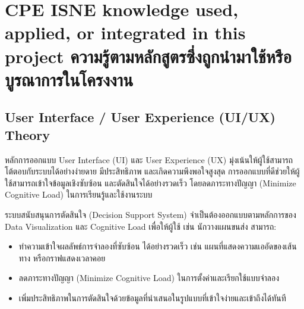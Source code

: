 


\section{\ifenglish%
\ifcpe CPE \else ISNE \fi knowledge used, applied, or integrated in this project
\else%
ความรู้ตามหลักสูตรซึ่งถูกนำมาใช้หรือบูรณาการในโครงงาน
\fi
}
\subsection{User Interface / User Experience (UI/UX) Theory}
หลักการออกแบบ User Interface (UI) และ User Experience (UX) มุ่งเน้นให้ผู้ใช้สามารถโต้ตอบกับระบบได้อย่างง่ายดาย
มีประสิทธิภาพ และเกิดความพึงพอใจสูงสุด การออกแบบที่ดีช่วยให้ผู้ใช้สามารถเข้าใจข้อมูลเชิงซับซ้อน
และตัดสินใจได้อย่างรวดเร็ว โดยลดภาระทางปัญญา (Minimize Cognitive Load) ในการเรียนรู้และใช้งานระบบ

ระบบสนับสนุนการตัดสินใจ (Decision Support System) จำเป็นต้องออกแบบตามหลักการของ Data Visualization
และ Cognitive Load เพื่อให้ผู้ใช้ เช่น นักวางแผนขนส่ง สามารถ:
\begin{itemize}
    \item ทำความเข้าใจผลลัพธ์การจำลองที่ซับซ้อน ได้อย่างรวดเร็ว เช่น แผนที่แสดงความแออัดของเส้นทาง
    หรือกราฟแสดงเวลาคอย
    \item ลดภาระทางปัญญา (Minimize Cognitive Load) ในการตั้งค่าและเรียกใช้แบบจำลอง
    \item เพิ่มประสิทธิภาพในการตัดสินใจด้วยข้อมูลที่นำเสนอในรูปแบบที่เข้าใจง่ายและเข้าถึงได้ทันที
\end{itemize}

